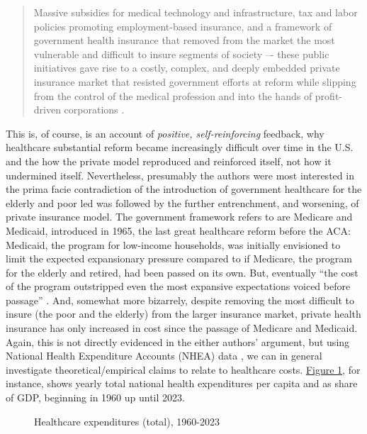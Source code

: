 \documentclass[11pt]{article}
\begin{document}
\begin{quote}
  Massive subsidies for medical technology and infrastructure, tax and labor policies promoting employment-based insurance, and a framework of government health insurance that removed from the market the most vulnerable and difficult to insure segments of society –- these public initiatives gave rise to a costly, complex, and deeply embedded private insurance market that resisted government efforts at reform while slipping from the control of the medical profession and into the hands of profit-driven corporations \parencite[][p. 107]{Hacker1998}.
\end{quote}

This is, of course, is an account of \textit{positive, self-reinforcing} feedback, why healthcare substantial reform became increasingly difficult over time in the U.S. and the how the private model reproduced and reinforced itself, not how it undermined itself. Nevertheless, presumably the authors were most interested in the prima facie contradiction of the introduction of government healthcare for the elderly and poor led was followed by the further entrenchment, and worsening, of private insurance model. The government framework \textcite[][]{Hacker1998} refers to are Medicare and Medicaid, introduced in 1965, the last great healthcare reform before the ACA: Medicaid, the program for low-income households, was initially envisioned to limit the expected expansionary pressure compared to if Medicare, the program for the elderly and retired, had been passed on its own. But, eventually \enquote{the cost of the program outstripped even the most expansive expectations voiced before passage} \parencite[118]{Hacker1998}. And, somewhat more bizarrely, despite removing the most difficult to insure (the poor and the elderly) from the larger insurance market, private health insurance has only increased in cost since the passage of Medicare and Medicaid. Again, this is not directly evidenced in the either authors' argument, but using National Health Expenditure Accounts (NHEA) data \parencite[][]{NHEA}, we can in general investigate theoretical/empirical claims to relate to healthcare costs. \hyperref[fig:expend_total]{Figure \ref*{fig:expend_total}}, for instance, shows yearly total national health expenditures per capita and as share of GDP, beginning in 1960 up until 2023.

\begin{figure}[H]
  \sffamily
  \caption{Healthcare expenditures (total), 1960-2023}
  
  \label{fig:expend_total}
\end{figure}
\end{document}
